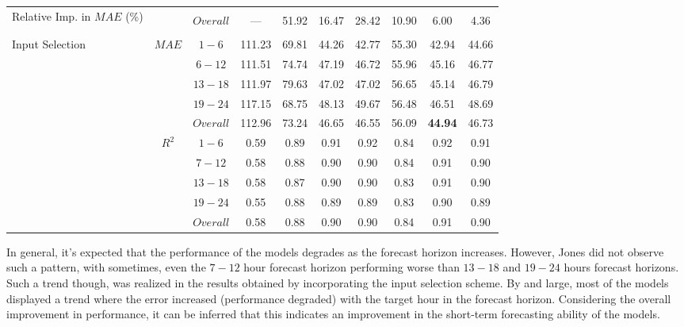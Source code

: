 \begin{table}[h]
\begin{center}
\begin{tabular}{@{}p{5.3em}ccccccccc@{}}
    \midrule
    \multirow{3}{5em}{Relative Imp. in $MAE$ (\%)} & & & & & & & & & \\
    & & $Overall$ & --- & 51.92 & 16.47 & 28.42 & 10.90 & 6.00 & 4.36 \\ 
    & & & & & & & & & \\ 
    \midrule
    \multirow{10}{5em}{Input Selection}
                                              & \multirow{5}{*}{$MAE$} & $1 - 6$ & 111.23 & 69.81 & 44.26 & 42.77 & 55.30 & 42.94 & 44.66 \\
                                              &                   & $6 - 12$ & 111.51 & 74.74 & 47.19 & 46.72 & 55.96 & 45.16 & 46.77 \\
                                              &                   & $13 - 18$ & 111.97 & 79.63 & 47.02 & 47.02 & 56.65 & 45.14 & 46.79 \\
                                              &                   & $19 - 24$ & 117.15 & 68.75 & 48.13 & 49.67 & 56.48 & 46.51 & 48.69 \\
                                              &                   & $Overall$ & 112.96 & 73.24 & 46.65 & 46.55 & 56.09 & \textbf{44.94} & 46.73 \\ \cmidrule(lr){2-10}
                                              & \multirow{5}{*}{$R^2$} & $1 - 6$ & 0.59 & 0.89 & 0.91 & 0.92 & 0.84 & 0.92 & 0.91 \\
                                              &                   & $7 - 12$ & 0.58 & 0.88 & 0.90 & 0.90 & 0.84 & 0.91 & 0.90 \\
                                              &                   & $13 - 18$ & 0.58 & 0.87 & 0.90 & 0.90 & 0.83 & 0.91 & 0.90 \\
                                              &                   & $19 - 24$ & 0.55 & 0.88 & 0.89 & 0.89 & 0.83 & 0.90 & 0.89 \\
                                              &                   & $Overall$ & 0.58 & 0.88 & 0.90 & 0.90 & 0.84 & 0.91 & 0.90 \\ 
    \bottomrule
    \end{tabular}
\end{center}
\end{table}


\par In general, it's expected that the performance of the models degrades as the forecast horizon increases. However, Jones \cite{thesis_zach} did not observe such a pattern, with sometimes, even the $7 - 12$ hour forecast horizon performing worse than $13 - 18$ and $19 - 24$ hours forecast horizons. Such a trend though, was realized in the results obtained by incorporating the input selection scheme. By and large, most of the models displayed a trend where the error increased (performance degraded) with the target hour in the forecast horizon. Considering the overall improvement in performance, it can be inferred that this indicates an improvement in the short-term forecasting ability of the models.

